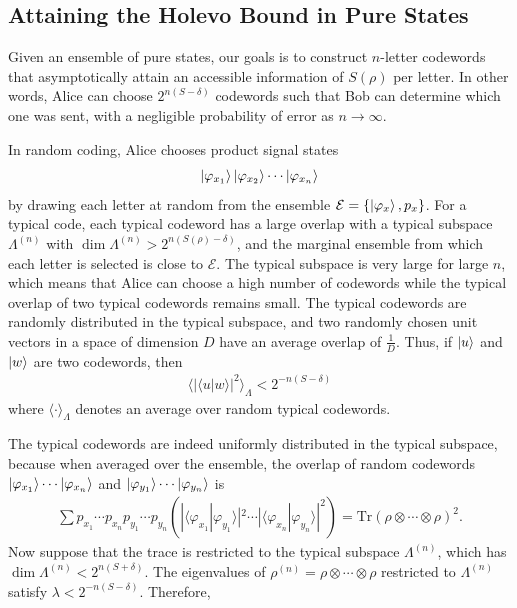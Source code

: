 \documentclass[a4paper, 12pt]{article}
\numberwithin{equation}{section}
\numberwithin{figure}{section}
\theoremstyle{definition}
\begin{document}
    \subsection{Attaining the Holevo Bound in Pure States}
    Given an ensemble of pure states, our goals is to construct $n$-letter codewords that asymptotically attain an accessible information of $S(\rho)$ per letter. In other words, Alice can choose $2^{n(S - \delta)}$ codewords such that Bob can determine which one was sent, with a negligible probability of error as $n \to \infty$. \par
    In random coding, Alice chooses product signal states
    \begin{align}
        \ket{\varphi_{x_1}} \ket{\varphi_{x_2}} \cdots \ket{\varphi_{x_n}}
    \end{align}
    by drawing each letter at random from the ensemble $\mathcal{E} = \{ \ket{\varphi_x}, p_x \}$. For a typical code, each typical codeword has a large overlap with a typical subspace $\Lambda^{(n)}$ with $\dim \Lambda^{(n)} > 2^{n(S(\rho) - \delta)}$, and the marginal ensemble from which each letter is selected is close to $\mathcal{E}$. The typical subspace is very large for large $n$, which means that Alice can choose a high number of codewords while the typical overlap of two typical codewords remains small. The typical codewords are randomly distributed in the typical subspace, and two randomly chosen unit vectors in a space of dimension $D$ have an average overlap of $\frac{1}{D}$. Thus, if $\ket{u}$ and $\ket{w}$ are two codewords, then
    \begin{align}
        \langle|\langle u | w \rangle|^2\rangle_\Lambda < 2^{-n(S - \delta)}
    \end{align}
    where $\langle \cdot \rangle_\Lambda$ denotes an average over random typical codewords. \par
    The typical codewords are indeed uniformly distributed in the typical subspace, because when averaged over the ensemble, the overlap of random codewords $\ket{\varphi_{x_1}} \cdots \ket{\varphi_{x_n}}$ and $\ket{\varphi_{y_1}} \cdots \ket{\varphi_{y_n}}$ is
    \begin{align}
        \sum p_{x_1} \cdots p_{x_n} p_{y_1} \cdots p_{y_n} \left( |\langle \varphi_{x_1} | \varphi_{y_1} \rangle|^2 \cdots |\langle \varphi_{x_n} | \varphi_{y_n} \rangle|^2 \right) = \text{Tr}(\rho \otimes \cdots \otimes \rho)^2.
    \end{align}
    Now suppose that the trace is restricted to the typical subspace $\Lambda^{(n)}$, which has $\dim \Lambda^{(n)} < 2^{n(S + \delta)}$. The eigenvalues of $\rho^{(n)} = \rho \otimes \cdots \otimes \rho$ restricted to $\Lambda^{(n)}$ satisfy $\lambda < 2^{{-n}(S - \delta)}$. Therefore,
\end{document}
